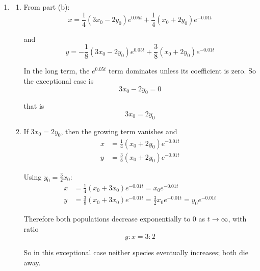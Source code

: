 \documentclass[leqno]{article}
\begin{document}
\begin{enumerate}[
  label=\textbf{\arabic*.},
  leftmargin=*,
  topsep=0pt,
  partopsep=0pt,
  parsep=0pt
]
\begin{djsSolution}
\begin{enumerate}[label=\textbf{(\alph*)}]
\begin{enumerate}[label=(\roman*)]
    Hence
    \[
    t=\frac{\ln 21}{0.06}\approx 50.7
    \]

    So the model predicts that species $Y$ disappears after about $50.7$ years.
  \end{enumerate}

  \item
  \begin{enumerate}[label=(\roman*)]
    \item From part (b):
    \[
    x=\frac14(3x_0-2y_0)e^{0.05t}+\frac14(x_0+2y_0)e^{-0.01t}
    \]

    and
    \[
    y=-\frac18(3x_0-2y_0)e^{0.05t}+\frac38(x_0+2y_0)e^{-0.01t}
    \]

    In the long term, the $e^{0.05t}$ term dominates unless its coefficient is zero. So the exceptional case is
    \[
    3x_0-2y_0=0
    \]

    that is
    \[
    3x_0=2y_0
    \]

    \item If $3x_0=2y_0$, then the growing term vanishes and
    \begin{align*}
    x&=\frac14(x_0+2y_0)e^{-0.01t} \\
    y&=\frac38(x_0+2y_0)e^{-0.01t}
    \end{align*}

    Using $y_0=\frac32x_0$:
    \begin{align*}
    x&=\frac14(x_0+3x_0)e^{-0.01t}=x_0e^{-0.01t} \\
    y&=\frac38(x_0+3x_0)e^{-0.01t}=\frac32x_0e^{-0.01t}=y_0e^{-0.01t}
    \end{align*}

    Therefore both populations decrease exponentially to $0$ as $t\to\infty$, with ratio
    \[
    y:x=3:2
    \]

    So in this exceptional case neither species eventually increases; both die away.
  \end{enumerate}
\end{enumerate}
\end{djsSolution}

\end{enumerate}
\end{document}
